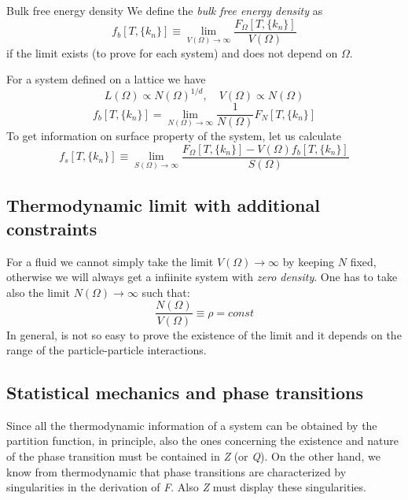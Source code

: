 \documentclass[../main/main.tex]{subfiles}
\begin{document}
  \begin{definition}{Bulk free energy density}{}
  We define the \emph{bulk free energy density} as
  \begin{equation}
    f_b [T,\{ k_n \}  ] \equiv \lim_{V (\Omega ) \rightarrow \infty } \frac{F_ \Omega [T,\{ k_n \}  ]}{V (\Omega )}
  \end{equation}
  if the limit exists (to prove for each system) and does not depend on \( \Omega  \).
  \end{definition}


For a system defined on a lattice we have
\begin{equation*}
  L (\Omega ) \propto N (\Omega )^{1/d}, \quad V (\Omega ) \propto N (\Omega )
\end{equation*}
\begin{equation*}
  f_b [T,\{ k_n \}  ] = \lim_{N (\Omega) \rightarrow \infty } \frac{1}{N (\Omega )} F_N [T,\{ k_n \}  ]
\end{equation*}
To get information on surface property of the system, let us calculate
\begin{equation}
  f_s [T,\{ k_n \}  ] \equiv \lim_{S (\Omega ) \rightarrow \infty } \frac{F_ \Omega [T,\{ k_n \}  ]  - V (\Omega ) f_b [T,\{ k_n \}  ]}{S (\Omega )}
\end{equation}

\subsection{Thermodynamic limit with additional constraints}
For a fluid we cannot simply take the limit \( V (\Omega ) \rightarrow \infty  \) by keeping \( N \) fixed, otherwise we will always get a infiinite system with \emph{zero density}. One has to take also the limit \( N(\Omega ) \rightarrow \infty  \) such that:
\begin{equation*}
  \frac{N (\Omega )}{V (\Omega )} \equiv \rho = const
\end{equation*}
In general, is not so easy to prove the existence of the limit and it depends on the range of the particle-particle interactions.

\subsection{Statistical mechanics and phase transitions}
Since all the thermodynamic information of a system can be obtained by the partition function, in principle, also the ones concerning the existence and nature of the phase transition must be contained in \emph{Z} (or \emph{Q}). On the other hand, we know from thermodynamic that phase transitions are characterized by singularities in the derivation of \emph{F}. Also \emph{Z} must display these singularities.
\end{document}
